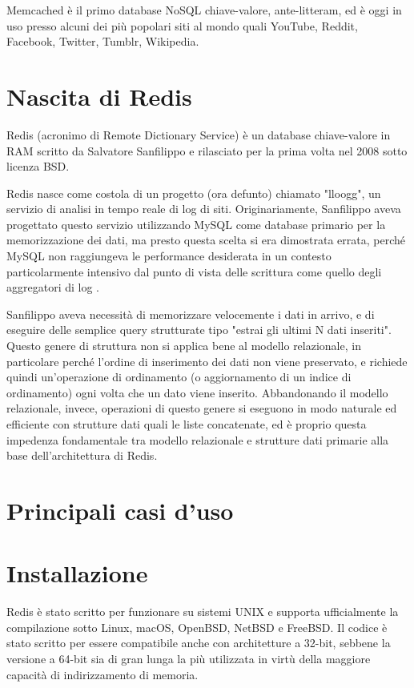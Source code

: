 Memcached è il primo database NoSQL chiave-valore, ante-litteram, ed è oggi in uso presso alcuni
dei più popolari siti al mondo quali YouTube, Reddit, Facebook, Twitter, Tumblr, Wikipedia.


\section{Nascita di Redis}

Redis (acronimo di Remote Dictionary Service) è un database chiave-valore in RAM scritto
da Salvatore Sanfilippo e rilasciato per la prima volta nel 2008 sotto licenza BSD.

Redis nasce come costola di un progetto (ora defunto) chiamato "lloogg", un servizio di
analisi in tempo reale di log di siti. Originariamente, Sanfilippo aveva progettato
questo servizio  utilizzando MySQL come database primario per la memorizzazione dei
dati, ma presto questa scelta si era dimostrata errata, perché MySQL non raggiungeva le
performance desiderata in un contesto particolarmente intensivo dal punto di vista delle
scrittura come quello degli aggregatori di log \cite{nascita}.

Sanfilippo aveva necessità di memorizzare velocemente i dati in arrivo, e di eseguire
delle semplice query strutturate tipo "estrai gli ultimi N dati inseriti". Questo genere
di struttura non si applica bene al modello relazionale, in particolare perché l'ordine
di inserimento dei dati non viene preservato, e richiede quindi un'operazione di ordinamento
(o aggiornamento di un indice di ordinamento) ogni volta che un dato viene inserito.
Abbandonando il modello relazionale, invece, operazioni di questo genere si eseguono
in modo naturale ed efficiente con strutture dati quali le liste concatenate, ed è
proprio questa impedenza fondamentale tra modello relazionale e strutture dati primarie
alla base dell'architettura di Redis.

\section{Principali casi d'uso}


\section{Installazione}

Redis è stato scritto per funzionare su sistemi UNIX e supporta ufficialmente la
compilazione sotto Linux, macOS, OpenBSD, NetBSD e FreeBSD. Il codice è stato scritto
per essere compatibile anche con architetture a 32-bit, sebbene la versione a 64-bit
sia di gran lunga la più utilizzata in virtù della maggiore capacità di indirizzamento
di memoria.

